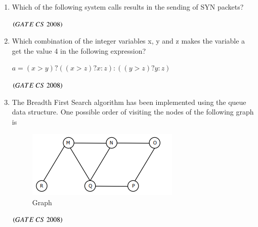 \documentclass[journal]{IEEEtran}
\numberwithin{equation}{enumi}
\numberwithin{figure}{enumi}
\begin{document}
\begin{enumerate}
\item Which of the following system calls results in the sending of SYN packets? 
\begin{enumerate} 
\end{enumerate}
\hfill $\left(GATE\ CS\  2008\right)$

\item Which combination of the integer variables x, y and z makes the variable a get the value 4 in the following expression? 
    
$a = (x>y)?((x>z)?x:z):((y>z)?y:z)$

\begin{enumerate}
\end{enumerate}
\hfill $\left(GATE\ CS\  2008\right)$

\item The Breadth First Search algorithm has been implemented using the queue data structure. One possible order of visiting the nodes of the following graph is
\begin{figure}[H]
\centering
\includegraphics[width=0.5\columnwidth]{figs/fig3.png}
\caption{Graph}
\label{fig:3}
\end{figure}
 \begin{enumerate}
\end{enumerate}
\hfill $\left(GATE\ CS\  2008\right)$


\end{enumerate}
\end{document}

